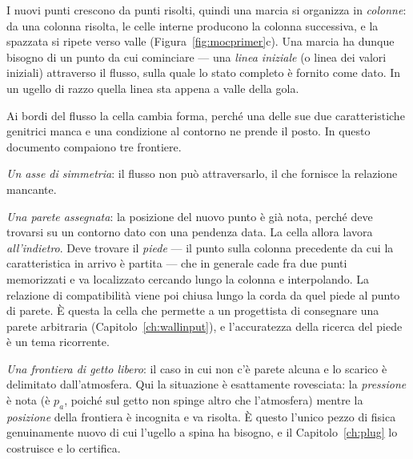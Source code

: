 I nuovi punti crescono da punti risolti, quindi una marcia si
organizza in \emph{colonne}: da una colonna risolta, le celle
interne producono la colonna successiva, e la spazzata si ripete
verso valle (Figura~\ref{fig:mocprimer}c). Una marcia ha dunque
bisogno di un punto da cui cominciare --- una \emph{linea iniziale}
(o linea dei valori iniziali) attraverso il flusso, sulla quale lo
stato completo è fornito come dato. In un ugello di razzo quella
linea sta appena a valle della gola.

Ai bordi del flusso la cella cambia forma, perché una delle sue due
caratteristiche genitrici manca e una condizione al contorno ne
prende il posto. In questo documento compaiono tre frontiere.

\emph{Un asse di simmetria}: il flusso non può attraversarlo, il che
fornisce la relazione mancante.

\emph{Una parete assegnata}: la posizione del nuovo punto è già
nota, perché deve trovarsi su un contorno dato con una pendenza
data. La cella allora lavora \emph{all'indietro}. Deve trovare il
\emph{piede} --- il punto sulla colonna precedente da cui la
caratteristica in arrivo è partita --- che in generale cade fra due
punti memorizzati e va localizzato cercando lungo la colonna e
interpolando. La relazione di compatibilità viene poi chiusa lungo
la corda da quel piede al punto di parete. È questa la cella che
permette a un progettista di consegnare una parete arbitraria
(Capitolo~\ref{ch:wallinput}), e l'accuratezza della ricerca del
piede è un tema ricorrente.

\emph{Una frontiera di getto libero}: il caso in cui non c'è parete
alcuna e lo scarico è delimitato dall'atmosfera. Qui la situazione è
esattamente rovesciata: la \emph{pressione} è nota (è $p_a$, poiché
sul getto non spinge altro che l'atmosfera) mentre la
\emph{posizione} della frontiera è incognita e va risolta. È questo
l'unico pezzo di fisica genuinamente nuovo di cui l'ugello a spina
ha bisogno, e il Capitolo~\ref{ch:plug} lo costruisce e lo
certifica.

